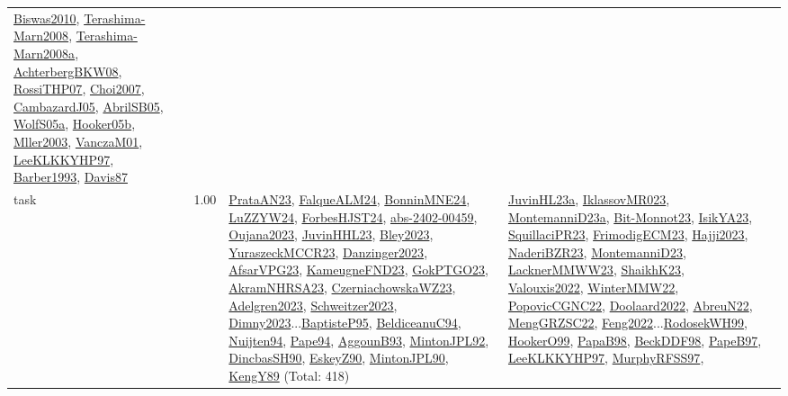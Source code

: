 {\begin{longtable}{p{3cm}r>{\raggedright\arraybackslash}p{6cm}>{\raggedright\arraybackslash}p{6cm}>{\raggedright\arraybackslash}p{8cm}}
\hyperref[detail:Biswas2010]{Biswas2010}, \hyperref[detail:Terashima-Marn2008]{Terashima-Marn2008}, \hyperref[detail:Terashima-Marn2008a]{Terashima-Marn2008a}, \hyperref[detail:AchterbergBKW08]{AchterbergBKW08}, \hyperref[detail:RossiTHP07]{RossiTHP07}, \hyperref[detail:Choi2007]{Choi2007}, \hyperref[detail:CambazardJ05]{CambazardJ05}, \hyperref[detail:AbrilSB05]{AbrilSB05}, \hyperref[detail:WolfS05a]{WolfS05a}, \hyperref[detail:Hooker05b]{Hooker05b}, \hyperref[detail:Mller2003]{Mller2003}, \hyperref[detail:VanczaM01]{VanczaM01}, \hyperref[detail:LeeKLKKYHP97]{LeeKLKKYHP97}, \hyperref[detail:Barber1993]{Barber1993}, \hyperref[detail:Davis87]{Davis87}\\
\index{task}\index{Scheduling!task}task &  1.00 & \hyperref[detail:PrataAN23]{PrataAN23}, \hyperref[detail:FalqueALM24]{FalqueALM24}, \hyperref[detail:BonninMNE24]{BonninMNE24}, \hyperref[detail:LuZZYW24]{LuZZYW24}, \hyperref[detail:ForbesHJST24]{ForbesHJST24}, \hyperref[detail:abs-2402-00459]{abs-2402-00459}, \hyperref[detail:Oujana2023]{Oujana2023}, \hyperref[detail:JuvinHHL23]{JuvinHHL23}, \hyperref[detail:Bley2023]{Bley2023}, \hyperref[detail:YuraszeckMCCR23]{YuraszeckMCCR23}, \hyperref[detail:Danzinger2023]{Danzinger2023}, \hyperref[detail:AfsarVPG23]{AfsarVPG23}, \hyperref[detail:KameugneFND23]{KameugneFND23}, \hyperref[detail:GokPTGO23]{GokPTGO23}, \hyperref[detail:AkramNHRSA23]{AkramNHRSA23}, \hyperref[detail:CzerniachowskaWZ23]{CzerniachowskaWZ23}, \hyperref[detail:Adelgren2023]{Adelgren2023}, \hyperref[detail:Schweitzer2023]{Schweitzer2023}, \hyperref[detail:Dimny2023]{Dimny2023}...\hyperref[detail:BaptisteP95]{BaptisteP95}, \hyperref[detail:BeldiceanuC94]{BeldiceanuC94}, \hyperref[detail:Nuijten94]{Nuijten94}, \hyperref[detail:Pape94]{Pape94}, \hyperref[detail:AggounB93]{AggounB93}, \hyperref[detail:MintonJPL92]{MintonJPL92}, \hyperref[detail:DincbasSH90]{DincbasSH90}, \hyperref[detail:EskeyZ90]{EskeyZ90}, \hyperref[detail:MintonJPL90]{MintonJPL90}, \hyperref[detail:KengY89]{KengY89} (Total: 418) & \hyperref[detail:JuvinHL23a]{JuvinHL23a}, \hyperref[detail:IklassovMR023]{IklassovMR023}, \hyperref[detail:MontemanniD23a]{MontemanniD23a}, \hyperref[detail:Bit-Monnot23]{Bit-Monnot23}, \hyperref[detail:IsikYA23]{IsikYA23}, \hyperref[detail:SquillaciPR23]{SquillaciPR23}, \hyperref[detail:FrimodigECM23]{FrimodigECM23}, \hyperref[detail:Hajji2023]{Hajji2023}, \hyperref[detail:NaderiBZR23]{NaderiBZR23}, \hyperref[detail:MontemanniD23]{MontemanniD23}, \hyperref[detail:LacknerMMWW23]{LacknerMMWW23}, \hyperref[detail:ShaikhK23]{ShaikhK23}, \hyperref[detail:Valouxis2022]{Valouxis2022}, \hyperref[detail:WinterMMW22]{WinterMMW22}, \hyperref[detail:PopovicCGNC22]{PopovicCGNC22}, \hyperref[detail:Doolaard2022]{Doolaard2022}, \hyperref[detail:AbreuN22]{AbreuN22}, \hyperref[detail:MengGRZSC22]{MengGRZSC22}, \hyperref[detail:Feng2022]{Feng2022}...\hyperref[detail:RodosekWH99]{RodosekWH99}, \hyperref[detail:HookerO99]{HookerO99}, \hyperref[detail:PapaB98]{PapaB98}, \hyperref[detail:BeckDDF98]{BeckDDF98}, \hyperref[detail:PapeB97]{PapeB97}, \hyperref[detail:LeeKLKKYHP97]{LeeKLKKYHP97}, \hyperref[detail:MurphyRFSS97]{MurphyRFSS97}, 
\end{longtable}}
